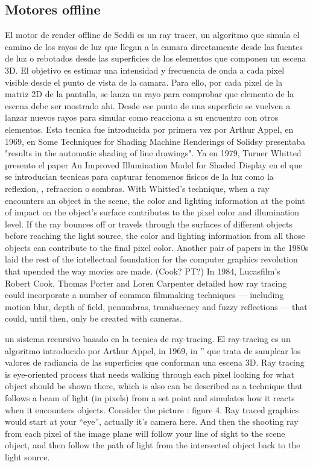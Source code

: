     \subsection{Motores offline}
    El motor de render offline de Seddi es un ray tracer, un algoritmo que simula el camino de los rayos de luz que llegan a la camara directamente desde las fuentes de luz o rebotados desde las superficies de los elementos que componen un escena 3D. El objetivo es estimar una intensidad y frecuencia de onda a cada pixel visible desde el punto de vista de la camara.
    Para ello, por cada pixel de la matriz 2D de la pantalla, se lanza un rayo para comprobar que elemento de la escena debe ser mostrado ahi. Desde ese punto de una superficie se vuelven a lanzar nuevos rayos para simular como reacciona a su encuentro con otros elementos.
    Esta tecnica fue introducida por primera vez por Arthur Appel, en 1969, en Some Techniques for Shading Machine Renderings of Solidsy presentaba  "results in the automatic shading of line drawings". Ya en 1979, Turner Whitted presento el paper  An Improved Illumination Model for Shaded Display en el que se introducian tecnicas para capturar fenomenos fisicos de la luz como la reflexion, , refraccion o sombras.
    With Whitted’s technique, when a ray encounters an object in the scene, the color and lighting information at the point of impact on the object’s surface contributes to the pixel color and illumination level. If the ray bounces off or travels through the surfaces of different objects before reaching the light source, the color and lighting information from all those objects can contribute to the final pixel color.
    Another pair of papers in the 1980s laid the rest of the intellectual foundation for the computer graphics revolution that upended the way movies are made. (Cook? PT?)
    In 1984, Lucasfilm’s Robert Cook, Thomas Porter and Loren Carpenter detailed how ray tracing could incorporate a number of common filmmaking techniques — including motion blur, depth of field, penumbras, translucency and fuzzy reflections — that could, until then, only be created with cameras.
    
    un sistema recursivo basado en la tecnica de ray-tracing.
    El ray-tracing es un algoritmo introducido por  Arthur Appel, in 1969, in ” que trata de samplear los valores de radiancia de las superficies que conforman una escena 3D.
    Ray tracing is eye-oriented process that needs walking through each pixel looking for what object should be shown there, which is also can be described as a technique that follows a beam of light (in pixels) from a set point and simulates how it reacts when it encounters objects.
    Consider the picture : figure 4. Ray traced graphics would start at your “eye”, actually it’s camera here. And then the shooting ray from each pixel of the image plane will follow your line of sight to the scene object, and then follow the path of light from the intersected object back to the light source.
    
